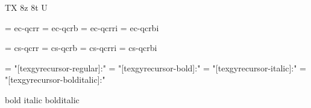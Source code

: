 
\ifx\ffdecl\undefined  \fi

\ffdecl [TG Cursor] {\rm \bf \it \bi} {\caps} {} {TX} {8z 8t U}

\def\caps{\ffsetV{caps}{-sc}\ffsetX}  \def\nocaps{\ffsetV{caps}{}\ffsetX}
\def\capsV{} 

\ismacro{}\ifttrue

   \font\tenrm = ec-qcrr  \sizespec
   \font\tenbf = ec-qcrb  \sizespec
   \font\tenit = ec-qcrri \sizespec
   \font\tenbi = ec-qcrbi \sizespec

   \def\ffnamegen{ec-qcr\ffvarV\capsV}

\fi

\ismacro{}\iftrue

   \font\tenrm = cs-qcrr  \sizespec
   \font\tenbf = cs-qcrb  \sizespec
   \font\tenit = cs-qcrri \sizespec
   \font\tenbi = cs-qcrbi \sizespec

   \def\ffnamegen{cs-qcr\ffvarV\capsV}
   

\fi

\ismacro{}\iftrue

   \font\tenrm = "[texgyrecursor-regular]:\fontfeatures"    \sizespec
   \font\tenbf = "[texgyrecursor-bold]:\fontfeatures"       \sizespec
   \font\tenit = "[texgyrecursor-italic]:\fontfeatures"     \sizespec
   \font\tenbi = "[texgyrecursor-bolditalic]:\fontfeatures" \sizespec

   \def\ffnamegen{"[texgyrecursor-\ffvarV]:\capsV\fontfeatures"} 

    {bold} {italic} {bolditalic}
   \def\caps{\ffsetV{caps}{+smcp;}\ffsetX}

\fi
\tenrm %

\ifx\loadmathfonts\relax \endinput \fi
\ifx\mathpreloaded X\else  \fi                     

\endinput
